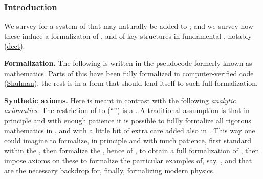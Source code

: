 \documentclass[12pt,titlepage]{article}
\theoremstyle{plain}
\theoremstyle{definition}
\theoremstyle{remark}
\begin{document}
\hypertarget{introduction}{}\subsubsection*{{Introduction}}\label{introduction}

We survey  for a system of  that may naturally be added to ; and we survey how these induce a  formalizaton of ,  and of key structures in fundamental , notably     (\hyperlink{dcct}{dcct}).

\textbf{Formalization.} The following is written in the pseudocode formerly known as mathematics. Parts of this have been fully formalized in computer-verified code (\hyperlink{Shulman}{Shulman}), the rest is in a form that should lend itself to such full formalization.

\textbf{Synthetic axioms.} Here  is meant in contrast with the following \emph{analytic axiomatics}: The restriction of  to  (``'') is a . A traditional assumption is that in principle and with enough patience it is possible to fullly formalize all rigorous mathematics in , and with a little bit of extra care added also in . This way one could imagine to formalize, in principle and with much patience, first standard  within the , then formalize the , hence of , to obtain a full formalization of , then impose axioms on these to formalize the particular examples of, say, ,  and  that are the necessary backdrop for, finally, formalizing modern physics.
\end{document}
